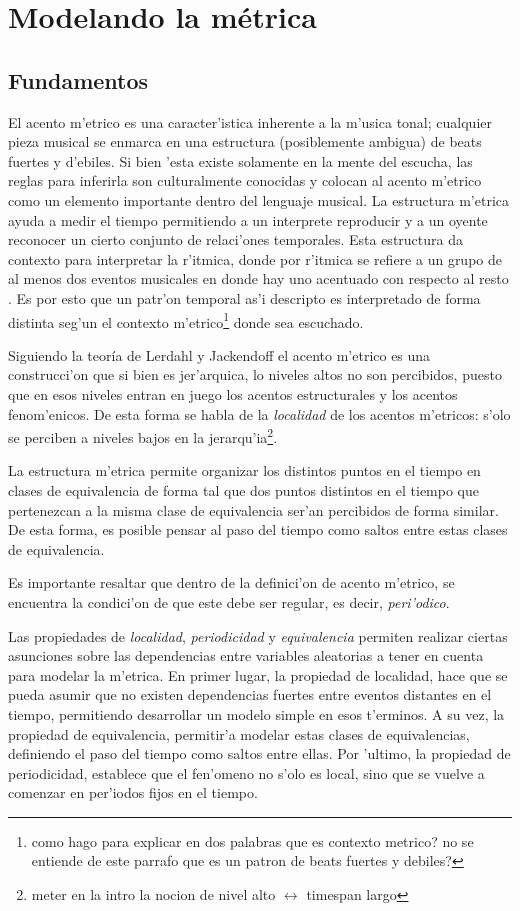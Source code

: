 \section{Modelando la m\'etrica}
\subsection{Fundamentos}
El acento m'etrico es una caracter'istica inherente a la m'usica tonal; cualquier pieza musical se enmarca en una estructura 
(posiblemente ambigua) de beats fuertes y d'ebiles. Si bien 'esta existe solamente en la mente del escucha, las reglas para inferirla son culturalmente conocidas 
y colocan al acento m'etrico como un elemento importante dentro del lenguaje musical. La estructura m'etrica ayuda a medir el tiempo permitiendo a un interprete 
reproducir y a un oyente reconocer un cierto conjunto de relaci'ones temporales. Esta estructura da contexto para interpretar la r'itmica,  
donde por r'itmica se refiere a un grupo de al menos dos eventos musicales en donde hay uno acentuado con respecto al resto \cite{CooperMeyer60}.
Es por esto que un patr'on temporal as'i descripto es interpretado de forma distinta seg'un el contexto m'etrico\footnote{como hago para explicar en dos palabras que es contexto metrico? no se entiende de este parrafo que es un patron de beats fuertes y debiles?} donde sea escuchado. 

Siguiendo la teor\'ia de Lerdahl y Jackendoff el acento m'etrico es una construcci'on que si bien es jer'arquica, lo niveles altos no son percibidos, puesto
que en esos niveles entran en juego los acentos estructurales y los acentos fenom'enicos. De esta forma se habla de la \emph{localidad} de los acentos m'etricos: 
s'olo se perciben a niveles bajos en la jerarqu'ia\footnote{meter en la intro la nocion de nivel alto $\leftrightarrow$ timespan largo}. 

La estructura m'etrica permite organizar los distintos puntos en el tiempo en clases de 
equivalencia de forma tal que dos puntos distintos en el tiempo que pertenezcan a la misma clase de equivalencia ser'an percibidos de forma similar\cite{Benjamin84}. 
De esta forma, es posible pensar al paso del tiempo como saltos entre estas clases de equivalencia.

Es importante resaltar que dentro de la definici'on de acento m'etrico, se encuentra la condici'on de que este debe ser regular, es decir, \emph{peri'odico}. 

Las propiedades de \emph{localidad}, \emph{periodicidad} y \emph{equivalencia} permiten realizar ciertas asunciones sobre las dependencias entre variables aleatorias 
a tener en cuenta para modelar la m'etrica. En primer lugar, la propiedad de localidad, hace que se pueda asumir que no existen dependencias fuertes entre eventos distantes 
en el tiempo, permitiendo desarrollar un modelo simple en esos t'erminos.  A su vez, la propiedad de equivalencia, permitir'a modelar estas clases de equivalencias, 
definiendo el paso del tiempo como saltos entre ellas. Por 'ultimo, la propiedad de periodicidad, establece que el fen'omeno no s'olo es local, 
sino que se vuelve a comenzar en per'iodos fijos en el tiempo.


